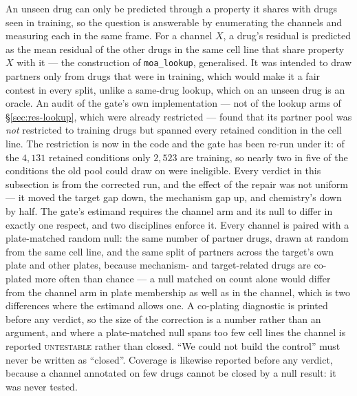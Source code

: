 An unseen drug can only be predicted through a property it shares with drugs seen in training, so
the question is answerable by enumerating the channels and measuring each in the same frame. For a
channel $X$, a drug's residual is predicted as the mean residual of the other drugs in the same cell
line that share property $X$ with it --- the construction of \texttt{moa\_lookup}, generalised.
It was intended to draw partners only from drugs that were in training, which would make it a fair
contest in every split, unlike a same-drug lookup, which on an unseen drug is an oracle. An audit
of the gate's own implementation --- not of the lookup arms of \S\ref{sec:res-lookup}, which were
already restricted --- found that its partner pool was \emph{not} restricted to training drugs but
spanned every retained condition in the cell line. The restriction is now in the code and the gate has been
re-run under it: of the $4{,}131$ retained conditions only $2{,}523$ are training, so nearly two in
five of the conditions the old pool could draw on were ineligible. Every verdict in this
subsection is from the corrected run, and the effect of the repair was not uniform --- it moved the
target gap down, the mechanism gap up, and chemistry's down by half. The gate's estimand requires the channel arm
and its null to differ in exactly one respect, and two disciplines enforce it. Every channel is
paired with a plate-matched random null: the same number of partner drugs, drawn at random from the
same cell line, and the same split of partners across the target's own plate and other plates,
because mechanism- and target-related drugs are co-plated more often than chance --- a null matched
on count alone would differ from the channel arm in plate membership as well as in the channel,
which is two differences where the estimand allows one. A co-plating diagnostic is printed before
any verdict, so the size of the correction is a number rather than an argument, and where a
plate-matched null spans too few cell lines the channel is reported \textsc{untestable} rather than
closed. ``We could not build the control'' must never be written as ``closed''. Coverage is
likewise reported before any verdict, because a channel annotated on few drugs cannot be closed by a
null result: it was never tested.

